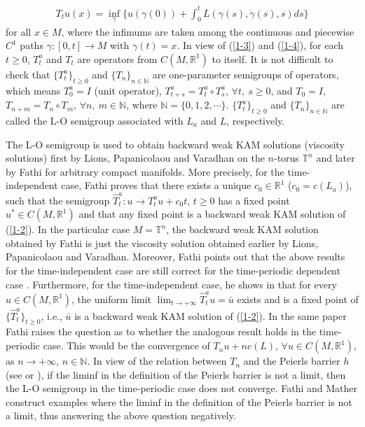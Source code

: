 \documentclass{amsart}[12pt]
\theoremstyle{definition}
\theoremstyle{remark}
\numberwithin{equation}{section}
\begin{document}
\begin{align}\label{1-4}
T_tu(x)=\inf_\gamma\Big\{u(\gamma(0))+\int_0^tL(\gamma(s),\dot{\gamma}(s),s)ds\Big\}
\end{align}
for all $x\in M$, where the infimums are taken among the
continuous and piecewise $C^1$ paths $\gamma:[0,t]\to M$ with
$\gamma(t)=x$. In view of (\ref{1-3}) and (\ref{1-4}), for each
$t\geq 0$, $T_t^a$ and $T_t$ are operators from
$C(M,\mathbb{R}^1)$ to itself. It is not difficult to check that
$\{T^a_t\}_{t\geq 0}$ and $\{T_n\}_{n\in\mathbb{N}}$ are
one-parameter semigroups of operators, which means $T^a_0=I$ (unit
operator), $T^a_{t+s}=T^a_t\circ T^a_s$, $\forall t,\ s\geq 0$,
and $T_0=I$, $T_{n+m}=T_n\circ T_m$, $\forall n,\ m\in\mathbb{N}$,
where $\mathbb{N}=\{0,1,2,\cdots\}$. $\{T^a_t\}_{t\geq 0}$ and
$\{T_n\}_{n\in\mathbb{N}}$ are called the L-O semigroup associated
with $L_a$ and $L$, respectively.

The L-O semigroup is used to obtain backward weak KAM solutions
(viscosity solutions) first by Lions, Papanicolaou and Varadhan
\cite{LPV} on the $n$-torus $\mathbb{T}^n$ and later by Fathi
\cite{Fat1} for arbitrary compact manifolds. More precisely, for
the time-independent case, Fathi \cite{Fat1} proves that there
exists a unique $c_0\in \mathbb{R}^1$ ($c_0=c(L_a)$), such that
the semigroup $\hat{T}^a_t:u\to T^a_tu+c_0t$, $t\geq 0$ has a
fixed point $u^*\in C(M,\mathbb{R}^1)$ and that any fixed point is
a backward weak KAM solution of (\ref{1-2}). In the particular
case $M=\mathbb{T}^n$, the backward weak KAM solution obtained by
Fathi is just the viscosity solution obtained earlier by Lions,
Papanicolaou and Varadhan. Moreover, Fathi points out that the
above results for the time-independent case are still correct for
the time-periodic dependent case \cite{Fat-b}. Furthermore, for
the time-independent case, he shows in \cite{Fat4} that for every
$u\in C(M,\mathbb{R}^1)$, the uniform limit
$\lim_{t\to+\infty}\hat{T}^a_tu=\bar{u}$ exists and is a fixed
point of $\{\hat{T}^a_t\}_{t\geq 0}$, i.e., $\bar{u}$ is a
backward weak KAM solution of (\ref{1-2}). In the same paper Fathi
raises the question as to whether the analogous result holds in
the time-periodic case. This would be the convergence of
$T_nu+nc(L)$, $\forall u\in C(M,\mathbb{R}^1)$, as $n\to+\infty$,
$n\in\mathbb{N}$. In view of the relation between $T_n$ and the
Peierls barrier $h$ (see \cite{Mat93} or \cite{Fat5,Ber,Con}), if
the liminf in the definition of the Peierls barrier is not a
limit, then the L-O semigroup in the time-periodic case does not
converge. Fathi and Mather \cite{Fat5} construct examples where
the liminf in the definition of the Peierls barrier is not a
limit, thus answering the above question negatively.
\end{document}
